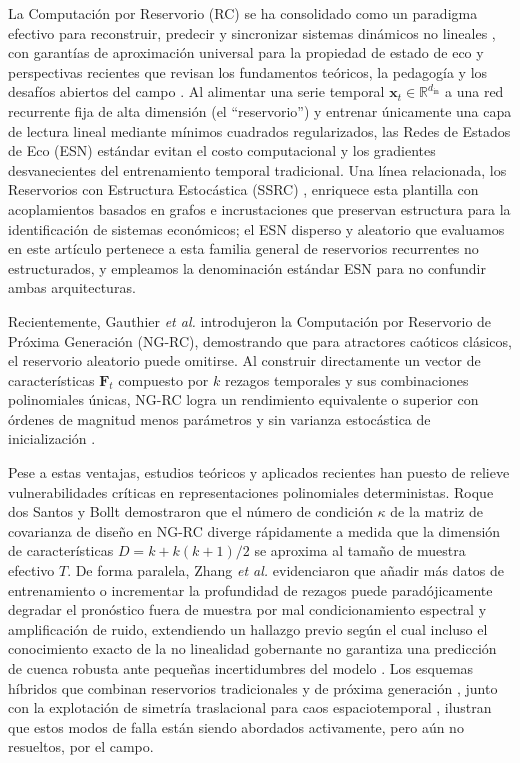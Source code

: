 \documentclass[aip,cha,reprint,amsmath,amssymb]{revtex4-2}
\begin{document}
La Computación por Reservorio (RC) se ha consolidado como un paradigma efectivo para reconstruir, predecir y sincronizar sistemas dinámicos no lineales \cite{jaeger2001echo,maass2002realtime,nakajima2021reservoir,yildiz2012revisiting,pathak2018model}, con garantías de aproximación universal para la propiedad de estado de eco \cite{grigoryevaortega2018echostate,gonon2023approximation} y perspectivas recientes que revisan los fundamentos teóricos, la pedagogía y los desafíos abiertos del campo \cite{yan2024emerging,amann2026nonlinear,inoue2026bootcamp,schotz2026machine}. Al alimentar una serie temporal $\mathbf{x}_t \in \mathbb{R}^{d_{\text{in}}}$ a una red recurrente fija de alta dimensión (el ``reservorio'') y entrenar únicamente una capa de lectura lineal mediante mínimos cuadrados regularizados, las Redes de Estados de Eco (ESN) estándar evitan el costo computacional y los gradientes desvanecientes del entrenamiento temporal tradicional. Una línea relacionada, los Reservorios con Estructura Estocástica (SSRC) \cite{banegas2025ssrc}, enriquece esta plantilla con acoplamientos basados en grafos e incrustaciones que preservan estructura para la identificación de sistemas económicos; el ESN disperso y aleatorio que evaluamos en este artículo pertenece a esta familia general de reservorios recurrentes no estructurados, y empleamos la denominación estándar ESN para no confundir ambas arquitecturas.

Recientemente, Gauthier \emph{et al.} \cite{gauthier2021next} introdujeron la Computación por Reservorio de Próxima Generación (NG-RC), demostrando que para atractores caóticos clásicos, el reservorio aleatorio puede omitirse. Al construir directamente un vector de características $\mathbf{F}_t$ compuesto por $k$ rezagos temporales y sus combinaciones polinomiales únicas, NG-RC logra un rendimiento equivalente o superior con órdenes de magnitud menos parámetros y sin varianza estocástica de inicialización \cite{bollt2021explaining}.

Pese a estas ventajas, estudios teóricos y aplicados recientes han puesto de relieve vulnerabilidades críticas en representaciones polinomiales deterministas. Roque dos Santos y Bollt \cite{dossantos2025instability} demostraron que el número de condición $\kappa$ de la matriz de covarianza de diseño en NG-RC diverge rápidamente a medida que la dimensión de características $D = k + k(k+1)/2$ se aproxima al tamaño de muestra efectivo $T$. De forma paralela, Zhang \emph{et al.} \cite{zhang2025moredata} evidenciaron que añadir más datos de entrenamiento o incrementar la profundidad de rezagos puede paradójicamente degradar el pronóstico fuera de muestra por mal condicionamiento espectral y amplificación de ruido, extendiendo un hallazgo previo según el cual incluso el conocimiento exacto de la no linealidad gobernante no garantiza una predicción de cuenca robusta ante pequeñas incertidumbres del modelo \cite{zhangcornelius2023catch22}. Los esquemas híbridos que combinan reservorios tradicionales y de próxima generación \cite{chepuri2024hybridizing}, junto con la explotación de simetría traslacional para caos espaciotemporal \cite{barbosagauthier2022learning}, ilustran que estos modos de falla están siendo abordados activamente, pero aún no resueltos, por el campo.
\end{document}
